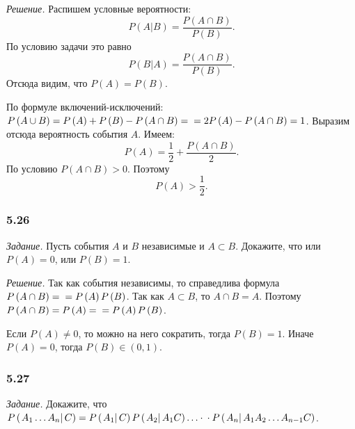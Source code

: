 \textit{Решение.} Распишем условные вероятности:
$$P \left( \left. A \right| B \right) =
\frac{P \left( A \cap B \right) }{P \left( B \right) }.$$
По условию задачи это равно
$$P \left( \left. B \right| A \right) =
\frac{P \left( A \cap B \right) }{P \left( B \right) }.$$
Отсюда видим, что $P \left( A \right) = P \left( B \right) $.

По формуле включений-исключений:
$P \left( A \cup B \right) =
P \left( A \right) + P \left( B \right) - P \left( A \cap B \right) = \\
= 2P \left( A \right) - P \left( A \cap B \right) =
1$.
Выразим отсюда вероятность события $A$.
Имеем:
$$P \left( A \right) = \frac{1}{2} + \frac{P \left( A \cap B \right) }{2}.$$
По условию $P \left( A \cap B \right) > 0$.
Поэтому
$$P \left( A \right) >
\frac{1}{2}.$$

\subsubsection*{5.26}

\textit{Задание.} Пусть события $A$ и $B$ независимые и $A \subset B$.
Докажите, что или $P \left( A \right) = 0$, или $P \left( B \right) = 1$.

\textit{Решение.} Так как события независимы, то справедлива формула $P \left( A \cap B \right) =  \\ = P \left( A \right) P \left( B \right) $.
Так как $A \subset B$, то $A \cap B = A$.
Поэтому $P \left( A \cap B \right) = P \left( A \right) = \\ = P \left( A \right) P \left( B \right) $.

Если $P \left( A \right) \neq 0$, то можно на него сократить, тогда $P \left( B \right) = 1$.
Иначе $P \left( A \right) = 0$, тогда $P \left( B \right) \in \left( 0, 1 \right) $.

\subsubsection*{5.27}

\textit{Задание.} Докажите, что
$P \left( \left. A_1 \dotsc A_n \right| C \right) =
P \left( \left. A_1 \right| C \right)
P \left( \left. A_2 \right| A_1 C \right) \dotsc \cdot \\
\cdot P \left( \left. A_n \right| A_1 A_2 \dotsc A_{n-1} C \right) $.


